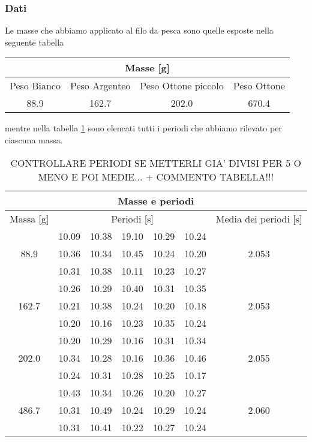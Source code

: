 \subsubsection{Dati}
Le masse che abbiamo applicato al filo da pesca sono quelle esposte nella seguente tabella

\begin{center}
	\begin{tabular}{c c c c}
			\multicolumn{4}{c}{\textbf{Masse [g]}} \\
	        \toprule
	        Peso Bianco & Peso Argenteo & Peso Ottone piccolo & Peso Ottone \\
	        \midrule
	        88.9 & 162.7 & 202.0 & 670.4 \\ 
	        \bottomrule
	\end{tabular}
\end{center}
mentre nella tabella \ref{tab:masse_periodi} sono elencati tutti i periodi che abbiamo rilevato per ciascuna massa.\\
\begin{table}
    \centering
    \begin{tabular}{c c c c c c c}
        \multicolumn{7}{c}{\textbf{Masse e periodi}} \\
        \toprule
        Massa [\si{\gram}] & \multicolumn{5}{c}{Periodi [s]} & Media dei periodi [s]\\
        \midrule
	\multirow{3}{*}{88.9}	& 10.09	& 10.38	& 19.10	& 10.29	& 10.24 & \multirow{3}{*}{2.053}\\
				& 10.36	& 10.34	& 10.45	& 10.24	& 10.20 &\\
				& 10.31	& 10.38	& 10.11	& 10.23	& 10.27 &\\
				\midrule
	\multirow{3}{*}{162.7}	& 10.26	& 10.29	& 10.40	& 10.31	& 10.35 & \multirow{3}{*}{2.053}\\
				& 10.21	& 10.38	& 10.24	& 10.20	& 10.18	\\
				& 10.20	& 10.16	& 10.23	& 10.35	& 10.24 \\
				\midrule
	\multirow{3}{*}{202.0}	& 10.20	& 10.29	& 10.16	& 10.31	& 10.34 & \multirow{3}{*}{2.055}\\
				& 10.34	& 10.28	& 10.16	& 10.36	& 10.46 \\
				& 10.24	& 10.31	& 10.28	& 10.25	& 10.17 \\
				\midrule
	\multirow{3}{*}{486.7}	& 10.43	& 10.34	& 10.26	& 10.20	& 10.27 & \multirow{3}{*}{2.060}\\
				& 10.31	& 10.49	& 10.24	& 10.29	& 10.24 \\
				& 10.31	& 10.41	& 10.22	& 10.27	& 10.24 \\
        \bottomrule
    \end{tabular}
    \caption{CONTROLLARE PERIODI SE METTERLI GIA' DIVISI PER 5 O MENO E POI MEDIE... + COMMENTO TABELLA!!!}
    \label{tab:masse_periodi}
\end{table}

